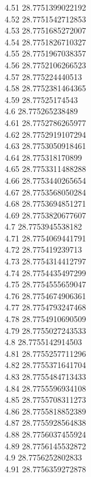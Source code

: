 {4.51	28.7751399022192\\
4.52	28.7751542712853\\
4.53	28.7751685272007\\
4.54	28.7751826710327\\
4.55	28.7751967038357\\
4.56	28.7752106266523\\
4.57	28.775224440513\\
4.58	28.7752381464365\\
4.59	28.77525174543\\
4.6	28.775265238489\\
4.61	28.7752786265977\\
4.62	28.7752919107294\\
4.63	28.7753050918461\\
4.64	28.775318170899\\
4.65	28.7753311488288\\
4.66	28.7753440265654\\
4.67	28.7753568050284\\
4.68	28.7753694851271\\
4.69	28.7753820677607\\
4.7	28.7753945538182\\
4.71	28.7754069441791\\
4.72	28.775419239713\\
4.73	28.7754314412797\\
4.74	28.7754435497299\\
4.75	28.7754555659047\\
4.76	28.7754674906361\\
4.77	28.7754793247468\\
4.78	28.7754910690509\\
4.79	28.7755027243533\\
4.8	28.7755142914503\\
4.81	28.7755257711296\\
4.82	28.7755371641704\\
4.83	28.7755484713433\\
4.84	28.7755596934108\\
4.85	28.7755708311273\\
4.86	28.7755818852389\\
4.87	28.7755928564838\\
4.88	28.7756037455924\\
4.89	28.7756145532872\\
4.9	28.7756252802833\\
4.91	28.7756359272878\\
}
